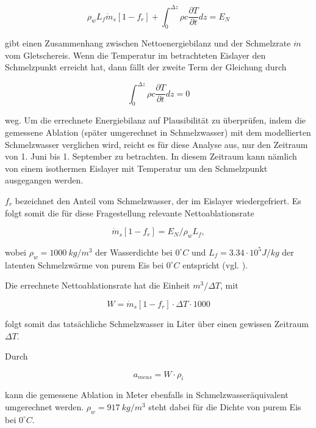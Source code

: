 \documentclass[12pt,a4paper]{article}
\begin{document}
\begin{equation}
\rho_{w} L_{f} \dot{m}_{s}\left[1-f_{r}\right]+\int_{0}^{\Delta z} \rho c \frac{\partial T}{\partial t} d z=E_{N}
\end{equation}


gibt einen Zusammenhang zwischen Nettoenergiebilanz und der Schmelzrate $\dot{m}$ vom Gletschereis. Wenn die Temperatur im betrachteten Eislayer den Schmelzpunkt erreicht hat, dann fällt der zweite Term der Gleichung durch


\begin{equation}
\int_{0}^{\Delta z} \rho c \frac{\partial T}{\partial t} d z=0
\end{equation}

weg. Um die errechnete Energiebilanz auf Plausibilität zu überprüfen, indem die gemessene Ablation (später umgerechnet in Schmelzwasser) mit dem modellierten Schmelzwasser verglichen wird, reicht es für diese Analyse aus, nur den Zeitraum von 1. Juni bis 1. September zu betrachten. In diesem Zeitraum kann nämlich von einem isothermen Eislayer mit Temperatur um den Schmelzpunkt ausgegangen werden.

$f_r$ bezeichnet den Anteil vom Schmelzwasser, der im Eislayer wiedergefriert. Es folgt somit die für diese Fragestellung relevante Nettoablationsrate 

\begin{equation}
\dot{m}_{s}\left[1-f_{r}\right]=E_{N} / \rho_{w} L_{f},
\end{equation}

wobei $\rho_{w}=1000~kg/m^{3}$ der Wasserdichte bei $0^\circ C$ und $L_{f}=3.34 \cdot 10^5 J/kg$ der latenten Schmelzwärme von purem Eis bei $0^\circ C$ entspricht (vgl. \cite[142]{ThePhysicsOfGlaciers}).

Die errechnete Nettoablationsrate hat die Einheit $m^3/\Delta T$, mit

\begin{equation}
W = \dot{m}_{s}\left[1-f_{r}\right] \cdot \Delta T \cdot 1000
\end{equation}


folgt somit das tatsächliche Schmelzwasser in Liter über einen gewissen Zeitraum $\Delta T$.

Durch 

\begin{equation}
a_{meas} = W \cdot \rho_{i}
\end{equation}


kann die gemessene Ablation in Meter ebenfalls in Schmelzwasseräquivalent umgerechnet werden. $\rho_{w}=917~kg/m^3$ steht dabei für die Dichte von purem Eis bei $0^\circ C$.\\
\end{document}
